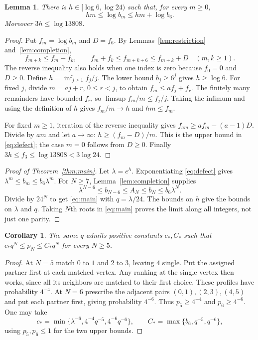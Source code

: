 \documentclass[11pt]{article}
\newtheorem{lemma}[theorem]{Lemma}
\newtheorem{corollary}[theorem]{Corollary}
\begin{document}
\begin{lemma}\label{lem:defect}
There is $h\in[\log6,\log24)$ such that, for every $m\geq0$,
\begin{equation}\label{eq:defect}
 hm\leq\log b_m\leq hm+\log b_6.
\end{equation}
Moreover $3h\leq\log13808$.
\end{lemma}
\begin{proof}
Put $f_m=\log b_m$ and $D=f_6$. By Lemmas~\ref{lem:restriction}
and~\ref{lem:completion},
\[
 f_{m+k}\leq f_m+f_k,\qquad
 f_m+f_k\leq f_{m+k+6}\leq f_{m+k}+D \quad(m,k\geq1).
\]
The reverse inequality also holds when one index is zero because
$f_0=0$ and $D\geq0$. Define $h=\inf_{j\geq1}f_j/j$.
The lower bound $b_j\geq6^j$ gives $h\geq\log6$.
For fixed $j$, divide $m=aj+r$, $0\leq r<j$, to obtain
$f_m\leq af_j+f_r$. The finitely many remainders have bounded $f_r$,
so $\limsup f_m/m\leq f_j/j$. Taking the infimum and using the
definition of $h$ gives $f_m/m\to h$ and $hm\leq f_m$.

For fixed $m\geq1$, iteration of the reverse inequality gives
$f_{am}\geq af_m-(a-1)D$. Divide by $am$ and let $a\to\infty$:
$h\geq(f_m-D)/m$. This is the upper bound in \eqref{eq:defect};
the case $m=0$ follows from $D\geq0$.
Finally $3h\leq f_3\leq\log13808<3\log24$.
\end{proof}

\begin{proof}[Proof of Theorem~\ref{thm:main}]
Let $\lambda=e^h$. Exponentiating \eqref{eq:defect} gives
$\lambda^m\leq b_m\leq b_6\lambda^m$. For $N\geq7$,
Lemma~\ref{lem:completion} supplies
\[
 \lambda^{N-6}\leq b_{N-6}\leq A_N\leq b_N\leq b_6\lambda^N.
\]
Divide by $24^N$ to get \eqref{eq:main} with $q=\lambda/24$.
The bounds on $h$ give the bounds on $\lambda$ and $q$.
Taking $N$th roots in \eqref{eq:main} proves the limit along all
integers, not just one parity.
\end{proof}

\begin{corollary}\label{cor:prefix}
The same $q$ admits positive constants $c_*,C_*$ such that
$c_*q^N\leq p_N\leq C_*q^N$ for every $N\geq5$.
\end{corollary}
\begin{proof}
At $N=5$ match $0$ to $1$ and $2$ to $3$, leaving $4$ single.
Put the assigned partner first at each matched vertex. Any ranking at
the single vertex then works, since all its neighbors are matched to
their first choice. These profiles have probability $4^{-4}$.
At $N=6$ prescribe the adjacent pairs $(0,1),(2,3),(4,5)$ and put
each partner first, giving probability $4^{-6}$.
Thus $p_5\geq4^{-4}$ and $p_6\geq4^{-6}$. One may take
\[
 c_*=\min\{\lambda^{-6},4^{-4}q^{-5},4^{-6}q^{-6}\},\qquad
 C_*=\max\{b_6,q^{-5},q^{-6}\},
\]
using $p_5,p_6\leq1$ for the two upper bounds.
\end{proof}
\end{document}
